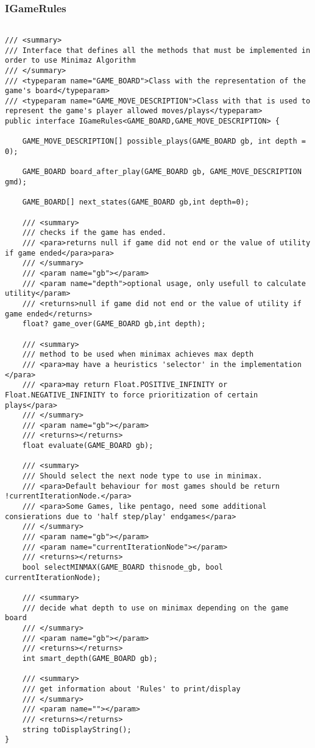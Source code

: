 \subsubsection{IGameRules}
\label{IGameRules}

\begin{lstlisting}

/// <summary>
/// Interface that defines all the methods that must be implemented in order to use Minimaz Algorithm
/// </summary>
/// <typeparam name="GAME_BOARD">Class with the representation of the game's board</typeparam>
/// <typeparam name="GAME_MOVE_DESCRIPTION">Class with that is used to represent the game's player allowed moves/plays</typeparam>
public interface IGameRules<GAME_BOARD,GAME_MOVE_DESCRIPTION> { 
	
	GAME_MOVE_DESCRIPTION[] possible_plays(GAME_BOARD gb, int depth = 0);
	
	GAME_BOARD board_after_play(GAME_BOARD gb, GAME_MOVE_DESCRIPTION gmd);

	GAME_BOARD[] next_states(GAME_BOARD gb,int depth=0);

    /// <summary>
    /// checks if the game has ended.
    /// <para>returns null if game did not end or the value of utility if game ended</para>para>
    /// </summary>
    /// <param name="gb"></param>
    /// <param name="depth">optional usage, only usefull to calculate utility</param>
    /// <returns>null if game did not end or the value of utility if game ended</returns>
    float? game_over(GAME_BOARD gb,int depth);

    /// <summary>
    /// method to be used when minimax achieves max depth
    /// <para>may have a heuristics 'selector' in the implementation </para>
    /// <para>may return Float.POSITIVE_INFINITY or Float.NEGATIVE_INFINITY to force prioritization of certain plays</para>
    /// </summary>
    /// <param name="gb"></param>
    /// <returns></returns>
    float evaluate(GAME_BOARD gb);

    /// <summary>
    /// Should select the next node type to use in minimax. 
    /// <para>Default behaviour for most games should be return !currentIterationNode.</para>
    /// <para>Some Games, like pentago, need some additional consierations due to 'half step/play' endgames</para>
    /// </summary>
    /// <param name="gb"></param>
    /// <param name="currentIterationNode"></param>
    /// <returns></returns>
    bool selectMINMAX(GAME_BOARD thisnode_gb, bool currentIterationNode);

    /// <summary>
    /// decide what depth to use on minimax depending on the game board
    /// </summary>
    /// <param name="gb"></param>
    /// <returns></returns>
    int smart_depth(GAME_BOARD gb);

    /// <summary>
    /// get information about 'Rules' to print/display
    /// </summary>
    /// <param name=""></param>
    /// <returns></returns>
    string toDisplayString();
}

\end{lstlisting}